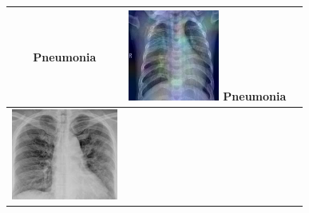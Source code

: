 \begin{longtable} { | c | c | c | }
\begin{minipage}{.3\textwidth}
           \centering  Pneumonia
               \vspace{0.5em}
    \end{minipage}
    & 
    \begin{minipage}{.3\textwidth}
        \vspace{1em}
      \includegraphics[width=\linewidth, height=30mm]{Images/PneuHeatmap3.jpg}
      \centering Pneumonia
          \vspace{0.5em}
    \end{minipage}
    \\ \hline
          \begin{minipage}{.3\textwidth}
    \vspace{1em}
      \includegraphics[width=\linewidth, height=30mm]{Images/covidOrig1.jpg}
    \vspace{0.5em}

\end{minipage}
\end{longtable}
